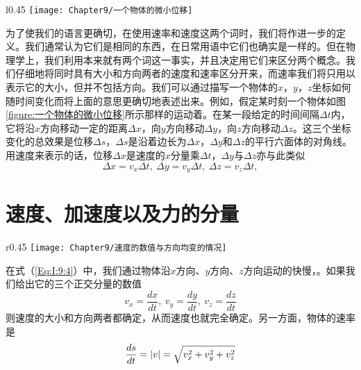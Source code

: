 \begin{wrapfigure}{l}{0.45\textwidth}
    \centering
    \texttt{[image: Chapter9/一个物体的微小位移]}
    \caption{一个物体的微小位移}
    \label{figure:一个物体的微小位移}
\end{wrapfigure}
为了使我们的语言更确切，在使用速率和速度这两个词时，我们将作进一步的定义。我们通常认为它们是相同的东西，在日常用语中它们也确实是一样的。但在物理学上，我们利用本来就有两个词这一事实，并且决定用它们来区分两个概念。我们仔细地将同时具有大小和方向两者的速度和速率区分开来，而速率我们将只用以表示它的大小，但并不包括方向。我们可以通过描写一个物体的$x$，$y$，$z$坐标如何随时间变化而将上面的意思更确切地表述出来。例如，假定某时刻一个物体如图\ref{figure:一个物体的微小位移}所示那样的运动着。在某一段给定的时间间隔$\Delta t$内，它将沿$x$方向移动一定的距离$\Delta x$，向$y$方向移动$\Delta y$，向$z$方向移动$\Delta z$。这三个坐标变化的总效果是位移$\Delta s$，$\Delta s$是沿着边长为$\Delta x$，$\Delta y$和$\Delta z$的平行六面体的对角线。用速度来表示的话，位移$\Delta x$是速度的$x$分量乘$\Delta t$，$\Delta y$与$\Delta z$亦与此类似
\begin{equation}
    \label{Eq:I:9:4}
    \Delta x=v_x \Delta t,~\Delta y=v_y \Delta t,~\Delta z=v_z \Delta t, 
\end{equation}

\section{速度、加速度以及力的分量}

\begin{wrapfigure}{r}{0.45\textwidth}
    \centering
    \texttt{[image: Chapter9/速度的数值与方向均变的情况]}
    \caption{速度的数值与方向均变的情况}
    \label{figure:速度的数值与方向均变的情况}
\end{wrapfigure}
在式（\ref{Eq:I:9:4}）中，我们通过物体沿$x$方向、$y$方向、$z$方向运动的快慢，。如果我们给出它的三个正交分量的数值
\begin{equation}
    \label{Eq:I:9:5}
    v_x=\frac{dx}{dt},~v_y=\frac{dy}{dt},~v_z=\frac{dz}{dt}
\end{equation}
则速度的大小和方向两者都确定，从而速度也就完全确定。另一方面，物体的速率是
\begin{equation}
    \label{Eq:I:9:6}
    \frac{ds}{dt}=\lvert v\rvert=\sqrt{v_x^2+v_y^2+v_z^2}
\end{equation}

